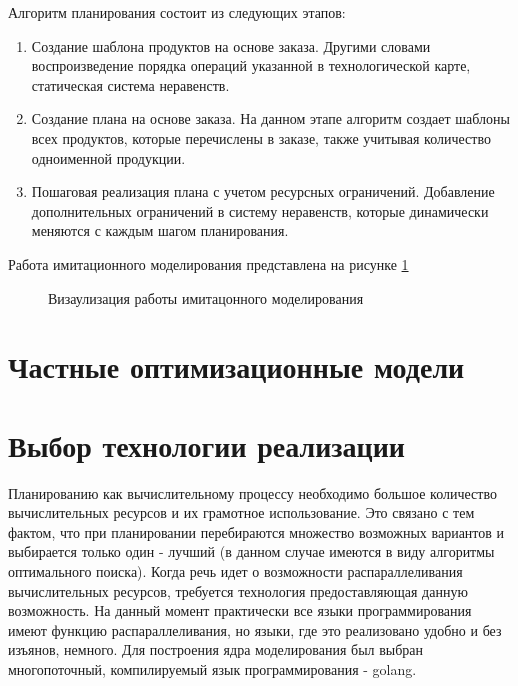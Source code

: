 Алгоритм планирования состоит из следующих этапов:
\begin{enumerate}
    \item Создание шаблона продуктов на основе заказа. Другими словами воспроизведение порядка операций указанной в технологической карте, статическая система неравенств.
    \item Создание плана на основе заказа. На данном этапе алгоритм создает шаблоны всех продуктов, которые перечислены в заказе, также учитывая количество одноименной продукции.
    \item Пошаговая реализация плана с учетом ресурсных ограничений. Добавление дополнительных ограничений в систему неравенств, которые динамически меняются с каждым шагом планирования.
\end{enumerate}
Работа имитационного моделирования представлена на рисунке \ref{ris:alg}
\begin{figure}[H]
    \caption{Визаулизация работы имитацонного моделирования}
    \label{ris:alg}
\end{figure}

\section{Частные оптимизационные модели}

\section{Выбор технологии реализации}

Планированию как вычислительному процессу необходимо большое количество вычислительных ресурсов и их грамотное использование. Это связано с тем фактом, что при планировании перебираются множество возможных вариантов и выбирается только один - лучший (в данном случае имеются в виду алгоритмы оптимального поиска). Когда речь идет о возможности распараллеливания вычислительных ресурсов, требуется технология предоставляющая данную возможность. На данный момент практически все языки программирования имеют функцию распараллеливания, но языки, где это реализовано удобно и без изъянов, немного.  Для построения ядра моделирования был выбран многопоточный, компилируемый язык программирования - golang.

